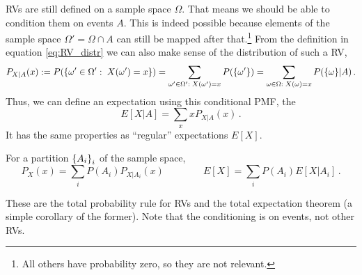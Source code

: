 RVs are still defined on a sample space $\Omega$. That means we should be able to condition them on events $A$. This is indeed possible because elements of the sample space $\Omega' = \Omega \cap A$ can still be mapped after that.\footnote{All others have probability zero, so they are not relevant.} From the definition in equation \eqref{eq:RV_distr} we can also make sense of the distribution of such a RV,
\begin{equation}
P_{X | A}(x) := P(\qty{\omega' \in \Omega': \; X(\omega') = x}) = \sum_{\omega' \in \Omega': \; X(\omega') = x} P(\qty{\omega'}) = \sum_{\omega \in \Omega: \; X(\omega) = x} P(\{\omega\} | A) \, .
\end{equation}
Thus, we can define an expectation using this conditional PMF, the 
\begin{equation}
E[X | A] = \sum_x x P_{X | A}(x) \, .
\end{equation}
It has the same properties as \enquote{regular} expectations $E[X]$.


\begin{prop}
For a partition $\qty{A_i}_i$ of the sample space,
\begin{equation}
P_X(x) = \sum_i P(A_i) P_{X | A_i}(x) \qquad \qquad E[X] = \sum_i P(A_i) E[X | A_i] \, .
\end{equation}
\end{prop}
These are the total probability rule for RVs and the total expectation theorem (a simple corollary of the former). Note that the conditioning is on events, not other RVs.


